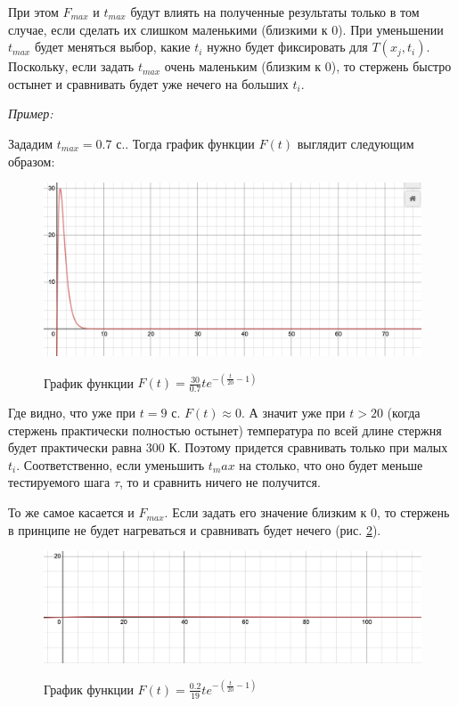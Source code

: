\documentclass[a4paper,12pt]{article}
\begin{document}
	При этом $F_{max}$ и $t_{max}$ будут влиять на полученные результаты только в том случае, если сделать их слишком маленькими (близкими к 0). При уменьшении $t_{max}$ будет меняться выбор, какие $t_i$ нужно будет фиксировать для $T(x_j, t_i)$. Поскольку, если задать $t_{max}$ очень маленьким (близким к 0), то стержень быстро остынет и сравнивать будет уже нечего на больших $t_i$.
	
	\textit{Пример:}
	
	Зададим $t_{max} = 0.7$ с.. Тогда график функции $F(t)$ выглядит следующим образом:
	
	\begin{figure}[h!]
		\begin{center}
			{\includegraphics[scale = 0.6]{F(t)_2.png}}
			\label{ris:F(t)_2}
		\end{center}
		\caption{График функции $F(t) = \frac{30}{0.7}t e^{-(\frac{t}{20} - 1)}$}
	\end{figure}

	Где видно, что уже при $t = 9$ с. $F(t) \approx 0$. А значит уже при $t > 20$ (когда стержень практически полностью остынет) температура по всей длине стержня будет практически равна 300 К. Поэтому придется сравнивать только при малых $t_i$. Соответственно, если уменьшить $t_max$ на столько, что оно будет меньше тестируемого шага $\tau$, то и сравнить ничего не получится.
	
	\newpage
	
	То же самое касается и $F_{max}$. Если задать его значение близким к 0, то стержень в принципе не будет нагреваться и сравнивать будет нечего (рис. \ref{ris:F(t)_3}).
	
	\begin{figure}[h!]
		\begin{center}
			{\includegraphics[scale = 0.6]{F(t)_3.png}}
		\end{center}
		\caption{График функции $F(t) = \frac{0.2}{19}t e^{-(\frac{t}{20} - 1)}$}
		\label{ris:F(t)_3}
	\end{figure}
	
\end{document}
